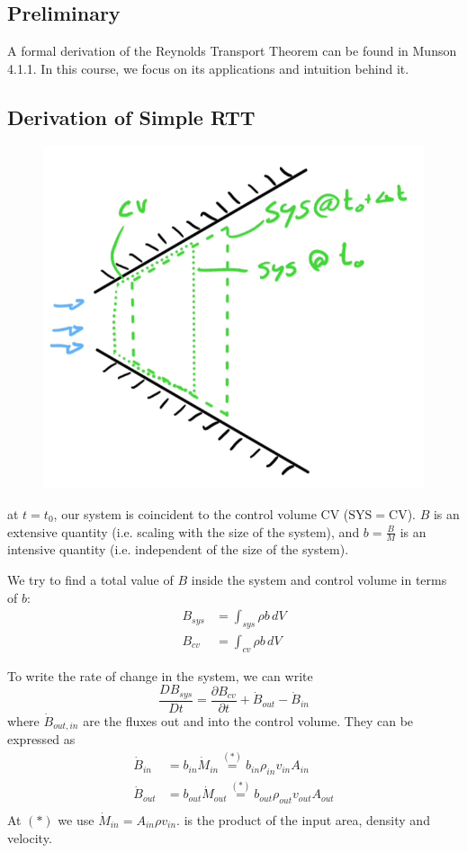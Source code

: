 \subsection{Preliminary}
A formal derivation of the Reynolds Transport Theorem can be found in Munson 4.1.1. In this course, we focus on its applications and intuition behind it.

\subsection{Derivation of Simple RTT}


\begin{figure}[H]
	\centering
	\includegraphics[width=0.4\linewidth]{Sketches/RTTSystemCV}
	\caption{}
	\label{fig:rttsystemcv}
\end{figure}

at $t=t_0$, our system is coincident to the control volume CV ($\mathrm {SYS} =\mathrm{CV}$). $B$ is an extensive quantity (i.e. scaling with the size of the system), and $b = \frac BM$ is an intensive quantity (i.e. independent of the size of the system).

We try to find a total value of $B$ inside the system and control volume in terms of $b$:
\begin{equation*}
	\begin{split}
		B_{sys} &= \int_{sys} \rho b \,dV\\
		B_{cv} &=\int_{cv} \rho b \,dV 
	\end{split}
\end{equation*}

To write the rate of change in the system, we can write
\begin{equation}
	\frac{DB_{sys}}{Dt} = \frac{\partial B_{cv}}{\partial t} + \dot B_{out} - \dot B_{in}
	\label{eq:rtt_rate_of_change}
\end{equation}
where $\dot B_{out,in}$ are the fluxes out and into the control volume. They can be expressed as
\begin{equation*}
	\begin{split}
		\dot B_{in} &= b_{in}\dot M_{in}\stackrel{(*)}{=} b_{in}\rho_{in}v_{in}A_{in}\\
		\dot B_{out} &= b_{out}\dot M_{out}\stackrel{(*)}{=} b_{out}\rho_{out}v_{out}A_{out}\\
	\end{split}
\end{equation*}
At $(*)$ we use $\dot M_{in}=A_{in}\rho v_{in}$. is the product of the input area, density and velocity.

